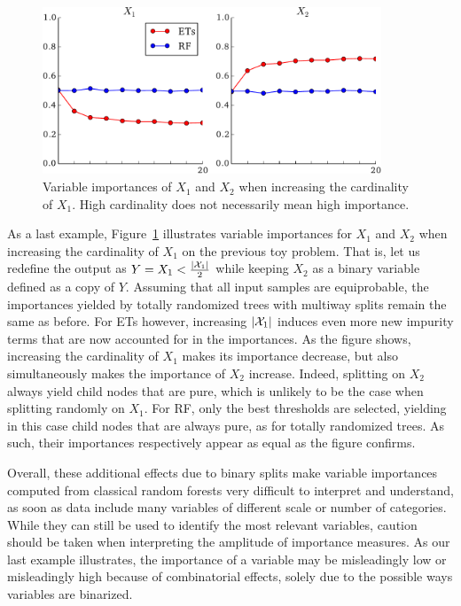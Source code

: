 \begin{figure}
\centering
\includegraphics[width=0.9\textwidth]{figures/ch7_bias_trees.pdf}
\caption{Variable importances of $X_1$ and $X_2$ when increasing the cardinality of $X_1$. High cardinality does not necessarily mean high importance. }
\label{fig:7:bias:trees}
\end{figure}

As a last example, Figure~\ref{fig:7:bias:trees} illustrates variable
importances for $X_1$ and $X_2$ when increasing the cardinality of $X_1$ on the
previous toy problem. That is, let us redefine the output as $Y = X_1 <
\tfrac{|{\cal X}_1|}{2}$ while keeping $X_2$ as a binary variable defined as a
copy of $Y$. Assuming that all input samples are equiprobable, the importances
yielded by totally randomized trees with multiway splits remain the same as
before. For ETs however, increasing $|{\cal X}_1|$ induces even more new impurity terms
that are now accounted for in the importances. As the figure shows, increasing
the cardinality of $X_1$ makes its importance decrease, but also simultaneously
makes the importance of $X_2$ increase. Indeed, splitting on $X_2$ always yield
child nodes that are pure, which is unlikely to be the case when splitting
randomly on $X_1$. For RF, only the best thresholds are selected, yielding in
this case child nodes that are always pure, as for totally randomized trees.
As such, their importances respectively appear as equal as the figure confirms.

Overall, these additional effects due to binary splits make variable
importances computed from classical random forests very difficult to interpret
and understand, as soon as data include many variables of different scale
or number of categories. While they can still be
used to identify the most relevant variables, caution should be taken when
interpreting the amplitude of importance measures. As our last example
illustrates, the importance of a variable may be misleadingly low or
misleadingly high because of combinatorial effects, solely due to the possible
ways variables are binarized.


